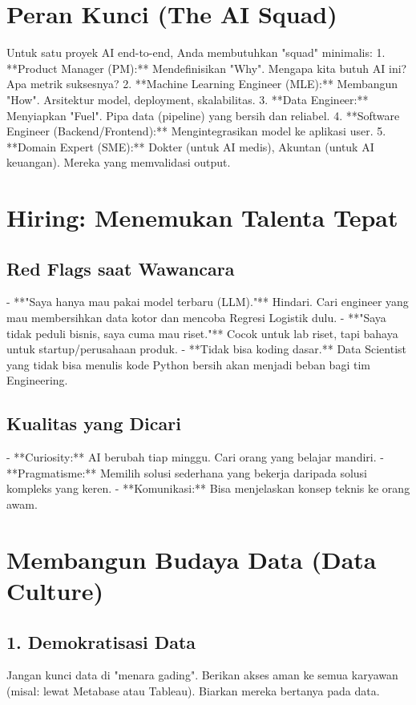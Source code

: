 \section{Peran Kunci (The AI Squad)}

Untuk satu proyek AI end-to-end, Anda membutuhkan "squad" minimalis:
1.  **Product Manager (PM):** Mendefinisikan "Why". Mengapa kita butuh AI ini? Apa metrik suksesnya?
2.  **Machine Learning Engineer (MLE):** Membangun "How". Arsitektur model, deployment, skalabilitas.
3.  **Data Engineer:** Menyiapkan "Fuel". Pipa data (pipeline) yang bersih dan reliabel.
4.  **Software Engineer (Backend/Frontend):** Mengintegrasikan model ke aplikasi user.
5.  **Domain Expert (SME):** Dokter (untuk AI medis), Akuntan (untuk AI keuangan). Mereka yang memvalidasi output.

\section{Hiring: Menemukan Talenta Tepat}

\subsection{Red Flags saat Wawancara}
- **"Saya hanya mau pakai model terbaru (LLM)."** Hindari. Cari engineer yang mau membersihkan data kotor dan mencoba Regresi Logistik dulu.
- **"Saya tidak peduli bisnis, saya cuma mau riset."** Cocok untuk lab riset, tapi bahaya untuk startup/perusahaan produk.
- **Tidak bisa koding dasar.** Data Scientist yang tidak bisa menulis kode Python bersih akan menjadi beban bagi tim Engineering.

\subsection{Kualitas yang Dicari}
- **Curiosity:** AI berubah tiap minggu. Cari orang yang belajar mandiri.
- **Pragmatisme:** Memilih solusi sederhana yang bekerja daripada solusi kompleks yang keren.
- **Komunikasi:** Bisa menjelaskan konsep teknis ke orang awam.

\section{Membangun Budaya Data (Data Culture)}

\subsection{1. Demokratisasi Data}
Jangan kunci data di "menara gading". Berikan akses aman ke semua karyawan (misal: lewat Metabase atau Tableau). Biarkan mereka bertanya pada data.

